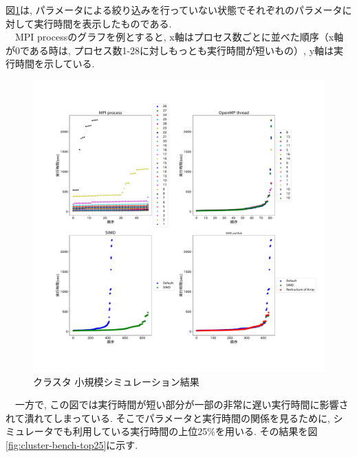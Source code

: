 図\ref{fig:cluster-bench}は, パラメータによる絞り込みを行っていない状態でそれぞれのパラメータに対して実行時間を表示したものである.\\
　MPI processのグラフを例とすると, x軸はプロセス数ごとに並べた順序（x軸が0である時は, プロセス数1-28に対しもっとも実行時間が短いもの）,
y軸は実行時間を示している.\\
\begin{figure}[htb]
 \begin{center}
    \includegraphics[width=14cm]{./images/cluster-bench.pdf}
    \caption{クラスタ 小規模シミュレーション結果}
    \label{fig:cluster-bench}
 \end{center}
\end{figure}
　一方で, この図では実行時間が短い部分が一部の非常に遅い実行時間に影響されて潰れてしまっている.
そこでパラメータと実行時間の関係を見るために, シミュレータでも利用している実行時間の上位25\%を用いる. その結果を図\ref{fig:cluster-bench-top25}に示す.\\
